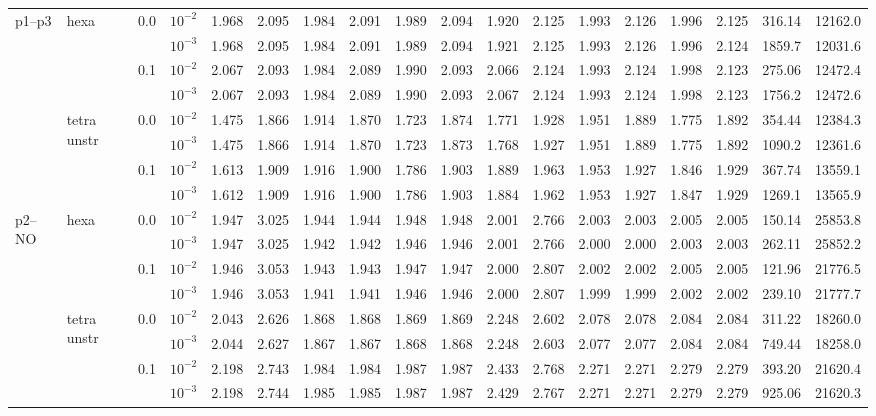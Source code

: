 \begin{longtable}{llclrrrrrrrrrrrrrr}
\multirow{8}{*}{p1--p3} & \multirow{4}{*}{hexa} & \multirow{2}{*}{0.0} & $10^{-2}$ & 1.968 & 2.095 & 1.984 & 2.091 & 1.989 & 2.094 & 1.920 & 2.125 & 1.993 & 2.126 & 1.996 & 2.125 & 316.14 & 12162.0 \\
& & & $10^{-3}$ & 1.968 & 2.095 & 1.984 & 2.091 & 1.989 & 2.094 & 1.921 & 2.125 & 1.993 & 2.126 & 1.996 & 2.124 & 1859.7 & 12031.6 \\\cline{3-18}
& & \multirow{2}{*}{0.1} & $10^{-2}$ & 2.067 & 2.093 & 1.984 & 2.089 & 1.990 & 2.093 & 2.066 & 2.124 & 1.993 & 2.124 & 1.998 & 2.123 & 275.06 & 12472.4 \\
& & & $10^{-3}$ & 2.067 & 2.093 & 1.984 & 2.089 & 1.990 & 2.093 & 2.067 & 2.124 & 1.993 & 2.124 & 1.998 & 2.123 & 1756.2 & 12472.6 \\\cline{2-18}
& \multirow{4}{*}{tetra unstr} & \multirow{2}{*}{0.0} & $10^{-2}$ & 1.475 & 1.866 & 1.914 & 1.870 & 1.723 & 1.874 & 1.771 & 1.928 & 1.951 & 1.889 & 1.775 & 1.892 & 354.44 & 12384.3 \\
& & & $10^{-3}$ & 1.475 & 1.866 & 1.914 & 1.870 & 1.723 & 1.873 & 1.768 & 1.927 & 1.951 & 1.889 & 1.775 & 1.892 & 1090.2 & 12361.6 \\\cline{3-18}
& & \multirow{2}{*}{0.1} & $10^{-2}$ & 1.613 & 1.909 & 1.916 & 1.900 & 1.786 & 1.903 & 1.889 & 1.963 & 1.953 & 1.927 & 1.846 & 1.929 & 367.74 & 13559.1 \\
& & & $10^{-3}$ & 1.612 & 1.909 & 1.916 & 1.900 & 1.786 & 1.903 & 1.884 & 1.962 & 1.953 & 1.927 & 1.847 & 1.929 & 1269.1 & 13565.9 \\\hline

\multirow{8}{*}{p2--NO} & \multirow{4}{*}{hexa} & \multirow{2}{*}{0.0} & $10^{-2}$ & 1.947 & 3.025 & 1.944 & 1.944 & 1.948 & 1.948 & 2.001 & 2.766 & 2.003 & 2.003 & 2.005 & 2.005 & 150.14 & 25853.8 \\
& & & $10^{-3}$ & 1.947 & 3.025 & 1.942 & 1.942 & 1.946 & 1.946 & 2.001 & 2.766 & 2.000 & 2.000 & 2.003 & 2.003 & 262.11 & 25852.2 \\\cline{3-18}
& & \multirow{2}{*}{0.1} & $10^{-2}$ & 1.946 & 3.053 & 1.943 & 1.943 & 1.947 & 1.947 & 2.000 & 2.807 & 2.002 & 2.002 & 2.005 & 2.005 & 121.96 & 21776.5 \\
& & & $10^{-3}$ & 1.946 & 3.053 & 1.941 & 1.941 & 1.946 & 1.946 & 2.000 & 2.807 & 1.999 & 1.999 & 2.002 & 2.002 & 239.10 & 21777.7 \\\cline{2-18}
& \multirow{4}{*}{tetra unstr} & \multirow{2}{*}{0.0} & $10^{-2}$ & 2.043 & 2.626 & 1.868 & 1.868 & 1.869 & 1.869 & 2.248 & 2.602 & 2.078 & 2.078 & 2.084 & 2.084 & 311.22 & 18260.0 \\
& & & $10^{-3}$ & 2.044 & 2.627 & 1.867 & 1.867 & 1.868 & 1.868 & 2.248 & 2.603 & 2.077 & 2.077 & 2.084 & 2.084 & 749.44 & 18258.0 \\\cline{3-18}
& & \multirow{2}{*}{0.1} & $10^{-2}$ & 2.198 & 2.743 & 1.984 & 1.984 & 1.987 & 1.987 & 2.433 & 2.768 & 2.271 & 2.271 & 2.279 & 2.279 & 393.20 & 21620.4 \\
& & & $10^{-3}$ & 2.198 & 2.744 & 1.985 & 1.985 & 1.987 & 1.987 & 2.429 & 2.767 & 2.271 & 2.271 & 2.279 & 2.279 & 925.06 & 21620.3 \\\hline


\end{longtable}
